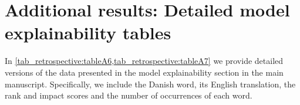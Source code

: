 {\begin{table}
{\begin{tabular}{l|ccccc}


        \bottomrule
    \end{tabular}%
    }
\end{table}


\section{Additional results: Detailed model explainability tables}

In \cref{tab_retrospective:tableA6,tab_retrospective:tableA7} we provide detailed versions of the data presented in the model explainability section in the main manuscript. Specifically, we include the Danish word, its English translation, the rank and impact scores and the number of occurrences of each word.


}
